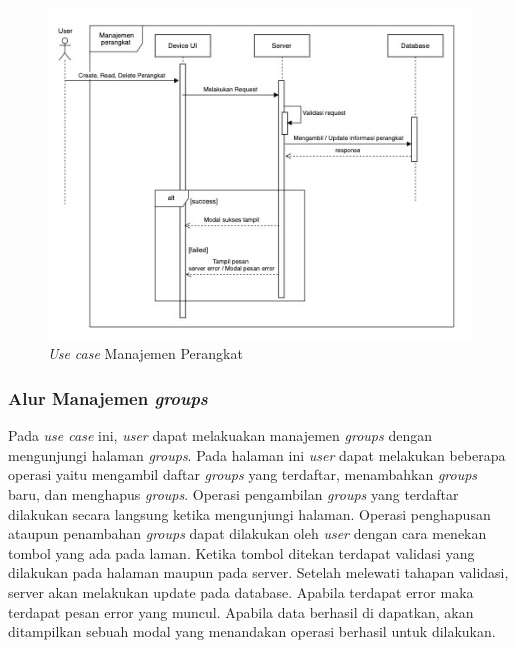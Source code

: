 \begin{figure}[h]
  \centering
  \includegraphics[width=1\textwidth]{resources/chapter-3/usecase/uc-08.jpg}
  \caption{\textit{Use case} Manajemen Perangkat}
  \label{fig:usecase-08}
\end{figure}

\pagebreak

\subsubsection{Alur Manajemen \textit{groups}}

Pada \textit{use case} ini, \textit{user} dapat melakuakan manajemen \textit{groups} dengan mengunjungi halaman \textit{groups}. Pada halaman ini \textit{user} dapat melakukan beberapa operasi yaitu mengambil daftar \textit{groups} yang terdaftar, menambahkan \textit{groups} baru, dan menghapus \textit{groups}. Operasi pengambilan \textit{groups} yang terdaftar dilakukan secara langsung ketika mengunjungi halaman. Operasi penghapusan ataupun penambahan \textit{groups} dapat dilakukan oleh \textit{user} dengan cara menekan tombol yang ada pada laman. Ketika tombol ditekan terdapat validasi yang dilakukan pada halaman maupun pada server. Setelah melewati tahapan validasi, server akan melakukan update pada database. Apabila terdapat error maka terdapat pesan error yang muncul. Apabila data berhasil di dapatkan, akan ditampilkan sebuah modal yang menandakan operasi berhasil untuk dilakukan.

